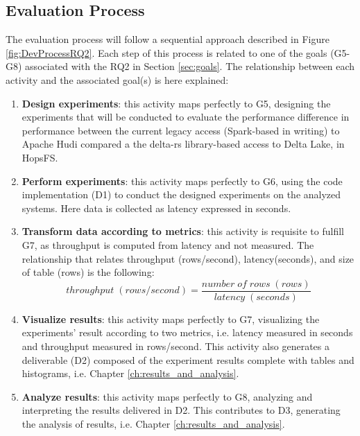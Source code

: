 \subsection{Evaluation Process}
\label{subsec:eval_process}
The evaluation process will follow a sequential approach described in Figure \ref{fig:DevProcessRQ2}. Each step of this process is related to one of the goals (G5-G8) associated with the RQ2 in Section \ref{sec:goals}.
The relationship between each activity and the associated goal(s) is here explained:
\begin{enumerate}
    \item \textbf{Design experiments}: this activity maps perfectly to G5, designing the experiments that will be conducted to evaluate the performance difference in performance between the current legacy access (Spark-based in writing) to Apache Hudi compared a the delta-rs \cite{DeltaioDeltars2024} library-based access to Delta Lake, in \gls{HopsFS}. 
    \item \textbf{Perform experiments}: this activity maps perfectly to G6, using the code implementation (D1) to conduct the designed experiments on the analyzed systems. Here data is collected as latency expressed in seconds.
    \item \textbf{Transform data according to metrics}: this activity is requisite to fulfill G7, as throughput is computed from latency and not measured. The relationship that relates throughput (rows/second), latency(seconds), and size of table (rows) is the following:
    \[ throughput \; (rows/second) = \frac{number \; of \; rows \; (rows)}{latency \;(seconds)}\]
    \item \textbf{Visualize results}: this activity maps perfectly to G7, visualizing the experiments' result according to two metrics, i.e. latency measured in seconds and throughput measured in rows/second. This activity also generates a deliverable (D2) composed of the experiment results complete with tables and histograms, i.e. Chapter \ref{ch:results_and_analysis}.
    \item \textbf{Analyze results}: this activity maps perfectly to G8, analyzing and interpreting the results delivered in D2. This contributes to D3, generating the analysis of results, i.e. Chapter \ref{ch:results_and_analysis}.
\end{enumerate}

